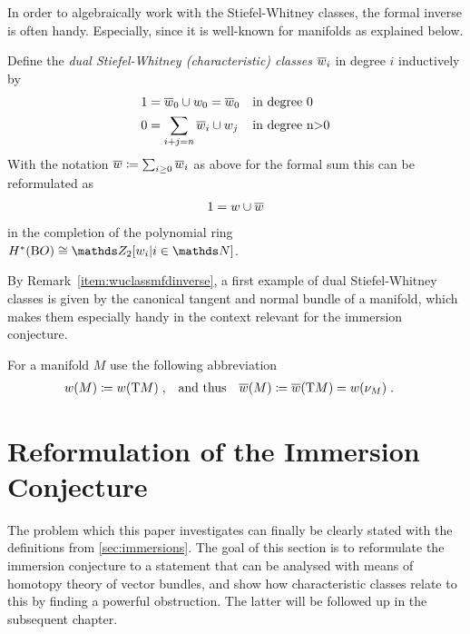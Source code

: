 In order to algebraically work with the Stiefel-Whitney classes, the
formal inverse is often handy. Especially, since it is well-known for
manifolds as explained below.
\begin{Def}
  Define the \emph{dual Stiefel-Whitney (characteristic) classes}
  $\overline{w}_{i}$ in degree $i$ inductively by
  \begin{align*}
    1 &= \overline{w}_{0}\cup w_{0} = \overline{w}_{0}    &&\text{in degree 0}\\
    0 &= \sum_{i+j=n} \overline{w}_{i}\cup w_{j}  &&\text{in degree n>0}
  \end{align*}
  With the notation $\overline{w}\coloneqq \sum_{i\geq0} \overline{w}_{i}$ as above
  for the formal sum this can be reformulated as
  \begin{gather*}
    1 = w\cup\overline{w}
  \end{gather*}
  in the completion of the polynomial ring $\H^*(\BO)\cong\Zmod2[\ws{i}|i\in\Nat]$.
\end{Def}
By
Remark~\ref{item:wuclassmfdinverse},
a first example of dual Stiefel-Whitney classes is given by the
canonical tangent and normal bundle of a manifold, which makes them
especially handy in the context relevant for the immersion conjecture.
\begin{Def}
  For a manifold $M$ use the following abbreviation
  \begin{align*}
    {w}(M) &\coloneqq {w}(\mathrm{T}M)
            \;,
    &\text{and thus}&
    &{\overline{w}}(M) &\coloneqq {\overline{w}}(\mathrm{T}M) = {w}(\nu_{M})
    \;.
  \end{align*}
\end{Def}

\section{Reformulation of the Immersion Conjecture}
\label{sec:reformulation}

The problem which this paper investigates can finally be clearly
stated with the definitions from
\autoref{sec:immersions}.
The goal of this section is to reformulate the immersion conjecture to
a statement that can be analysed with means of homotopy theory of
vector bundles, and show how characteristic classes relate to this by
finding a powerful obstruction.
The latter will be followed up in the subsequent chapter.

